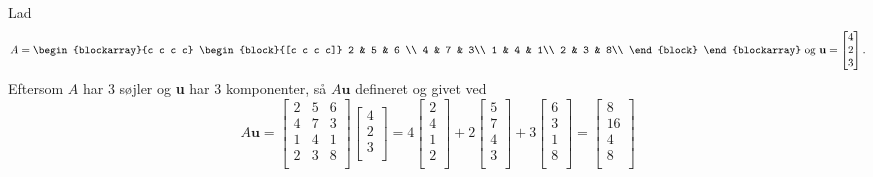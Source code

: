 \begin{eks}
\label{Matrix-vektor}
%
Lad
$$A=
\begin{blockarray}{c c c c}
\begin{block}{[c c c c]}
2 & 5 & 6 \\
4 & 7 & 3\\
1 & 4 & 1\\
2 & 3 & 8\\
\end{block}
\end{blockarray}
%
\text{ og }
%
\textbf{u}=
\begin{bmatrix}
4 \\
2 \\
3 \\ 
\end{bmatrix}.
$$
%
Eftersom $A$ har 3 søjler og \textbf{u} har 3 komponenter, så $A\textbf{u}$ defineret og givet ved
$$
A\textbf{u}=
\begin{bmatrix}
2 & 5 & 6 \\
4 & 7 & 3\\
1 & 4 & 1\\
2 & 3 & 8\\
\end{bmatrix}
\begin{bmatrix}
4 \\
2 \\
3 \\ 
\end{bmatrix}
=4
\begin{bmatrix}
2\\
4\\
1\\
2\\
\end{bmatrix}
+2
\begin{bmatrix}
5\\
7\\
4\\
3\\
\end{bmatrix}
+3
\begin{bmatrix}
6\\
3\\
1\\
8\\
\end{bmatrix}
=
\begin{bmatrix}
8\\
16\\
4\\
8\\
\end{bmatrix}
$$
\end{eks}
